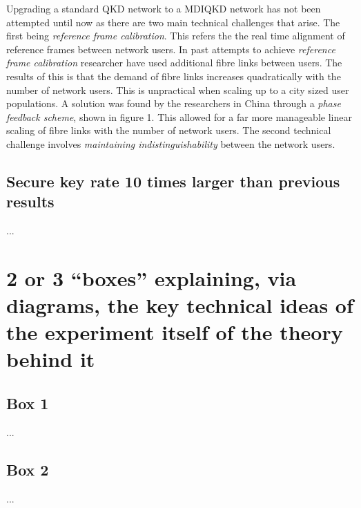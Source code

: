 \documentclass{article}
\begin{document}
\vspace*{3mm}

Upgrading a standard QKD network to a MDIQKD network has not been attempted until now as there are two main technical challenges that arise. The first being \textit{reference frame calibration}. This refers the the real time alignment of reference frames between network users. In past attempts to achieve \textit{reference frame calibration} researcher have used additional fibre links between users. The results of this is that the demand of fibre links increases quadratically with the number of network users. This is unpractical when scaling up to a city sized user populations. A solution was found by the researchers in China through a \textit{phase feedback scheme}, shown in figure 1. This allowed for a far more manageable linear scaling of fibre links with the number of network users. The second technical challenge involves \textit{maintaining indistinguishability} between the network users.

\subsection*{Secure key rate 10 times larger than previous results}
...

\section*{2 or 3 “boxes” explaining, via diagrams, the key technical ideas of the experiment itself of the theory behind it}

\subsection*{Box 1}
...

   

\subsection*{Box 2}
...

  
  
\end{document}
